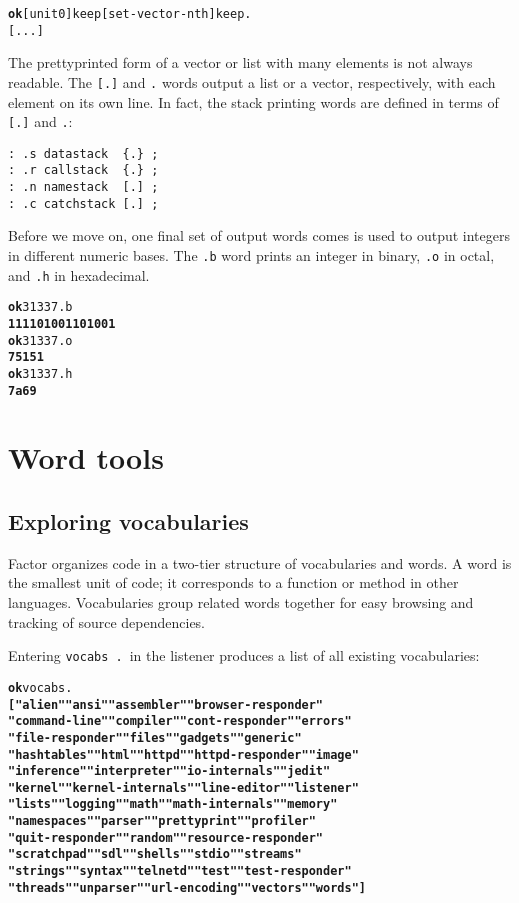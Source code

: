 \documentclass{report}
\newcommand{\tto}{\symbol{123}}
\newcommand{\ttc}{\symbol{125}}
\begin{document}
\begin{alltt}
\textbf{ok} \tto \ttc [ unit 0 ] keep [ set-vector-nth ] keep .
\tto [ ... ] \ttc
\end{alltt}

The prettyprinted form of a vector or list with many elements is not always readable. The \texttt{[.]} and \texttt{\tto.\ttc} words output a list or a vector, respectively, with each element on its own line. In fact, the stack printing words are defined in terms of \texttt{[.]} and \texttt{\tto.\ttc}:

\begin{verbatim}
: .s datastack  {.} ;
: .r callstack  {.} ;
: .n namestack  [.] ;
: .c catchstack [.] ;
\end{verbatim}

Before we move on, one final set of output words comes is used to output integers in
different numeric bases. The \texttt{.b} word prints an integer in binary, \texttt{.o} in octal, and \texttt{.h} in hexadecimal.

\begin{alltt}
\textbf{ok} 31337 .b
\textbf{111101001101001}
\textbf{ok} 31337 .o
\textbf{75151}
\textbf{ok} 31337 .h
\textbf{7a69}
\end{alltt}

\section{Word tools}

\subsection{Exploring vocabularies}

Factor organizes code in a two-tier structure of vocabularies and words. A word is the smallest unit of code; it corresponds to a function or method in other languages. Vocabularies group related words together for easy browsing and tracking of source dependencies.

Entering \texttt{vocabs .}~in the listener produces a list of all existing vocabularies:

\begin{alltt}
\textbf{ok} vocabs .
\textbf{[ "alien" "ansi" "assembler" "browser-responder"
"command-line" "compiler" "cont-responder" "errors"
"file-responder" "files" "gadgets" "generic"
"hashtables" "html" "httpd" "httpd-responder" "image"
"inference" "interpreter" "io-internals" "jedit"
"kernel" "kernel-internals" "line-editor" "listener"
"lists" "logging" "math" "math-internals" "memory"
"namespaces" "parser" "prettyprint" "profiler"
"quit-responder" "random" "resource-responder"
"scratchpad" "sdl" "shells" "stdio" "streams"
"strings" "syntax" "telnetd" "test" "test-responder"
"threads" "unparser" "url-encoding" "vectors" "words" ]}
\end{alltt}
\end{document}
